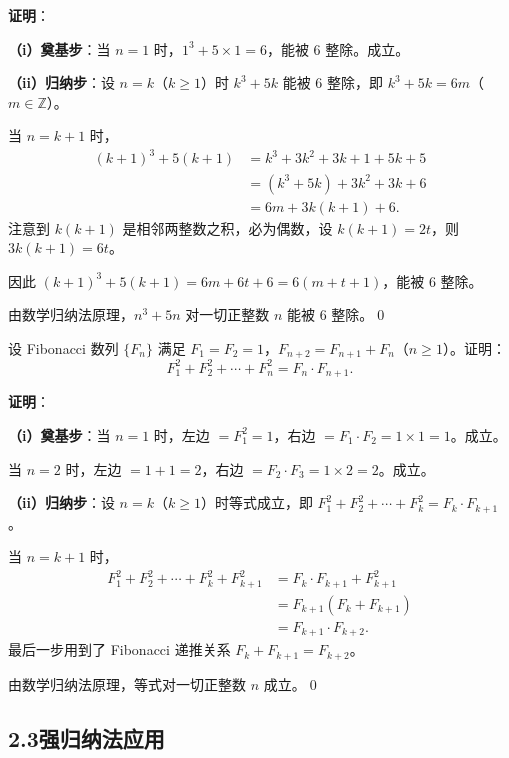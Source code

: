\documentclass[12pt, a4paper]{ctexart}
\begin{document}
\textbf{证明}：

\textbf{（i）奠基步}：当 $n=1$ 时，$1^3 + 5 \times 1 = 6$，能被 $6$ 整除。成立。

\textbf{（ii）归纳步}：设 $n = k$（$k \geq 1$）时 $k^3 + 5k$ 能被 $6$ 整除，即 $k^3 + 5k = 6m$（$m \in \mathbb{Z}$）。

当 $n = k+1$ 时，
\begin{align*}
(k+1)^3 + 5(k+1) &= k^3 + 3k^2 + 3k + 1 + 5k + 5 \\
&= (k^3 + 5k) + 3k^2 + 3k + 6 \\
&= 6m + 3k(k+1) + 6.
\end{align*}
注意到 $k(k+1)$ 是相邻两整数之积，必为偶数，设 $k(k+1) = 2t$，则 $3k(k+1) = 6t$。

因此 $(k+1)^3 + 5(k+1) = 6m + 6t + 6 = 6(m + t + 1)$，能被 $6$ 整除。

由数学归纳法原理，$n^3 + 5n$ 对一切正整数 $n$ 能被 $6$ 整除。\qed

\begin{examplebox}
设 Fibonacci 数列 $\{F_n\}$ 满足 $F_1 = F_2 = 1$，$F_{n+2} = F_{n+1} + F_n$（$n \geq 1$）。证明：
\[ F_1^2 + F_2^2 + \cdots + F_n^2 = F_n \cdot F_{n+1}. \]
\end{examplebox}

\textbf{证明}：

\textbf{（i）奠基步}：当 $n=1$ 时，左边 $= F_1^2 = 1$，右边 $= F_1 \cdot F_2 = 1 \times 1 = 1$。成立。

当 $n=2$ 时，左边 $= 1 + 1 = 2$，右边 $= F_2 \cdot F_3 = 1 \times 2 = 2$。成立。

\textbf{（ii）归纳步}：设 $n = k$（$k \geq 1$）时等式成立，即 $F_1^2 + F_2^2 + \cdots + F_k^2 = F_k \cdot F_{k+1}$。

当 $n = k+1$ 时，
\begin{align*}
F_1^2 + F_2^2 + \cdots + F_k^2 + F_{k+1}^2 &= F_k \cdot F_{k+1} + F_{k+1}^2 \\
&= F_{k+1}(F_k + F_{k+1}) \\
&= F_{k+1} \cdot F_{k+2}.
\end{align*}
最后一步用到了 Fibonacci 递推关系 $F_k + F_{k+1} = F_{k+2}$。

由数学归纳法原理，等式对一切正整数 $n$ 成立。\qed

\subsection*{2.3\quad 强归纳法应用}
\end{document}
